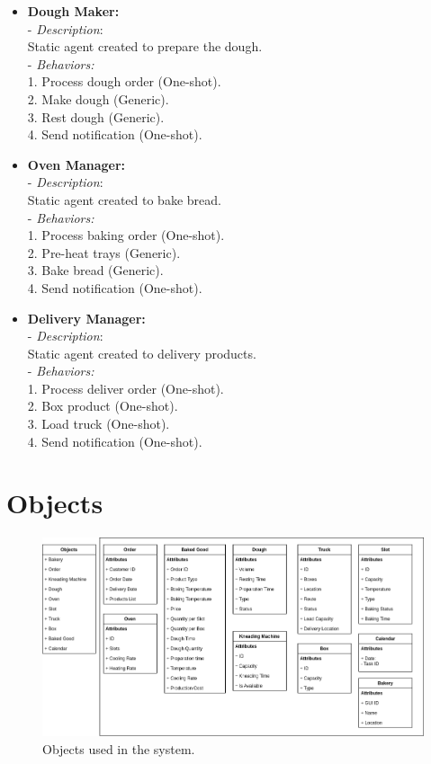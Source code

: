 \documentclass[a4paper]{article}
\begin{document}
\begin{itemize}
		 \item{\textbf{Dough Maker:} \\
		 	- \textit{Description}:\\
		 	Static agent created to prepare the dough. \\
		 	- \textit{Behaviors:} \\
		 	1. Process dough order (One-shot).\\
		 	2. Make dough (Generic).\\
		 	3. Rest dough (Generic).\\
		 	4. Send notification (One-shot).}
		 
		 \item{\textbf{Oven Manager:} \\
		 	- \textit{Description}:\\
		 	Static agent created to bake bread. \\
		 	- \textit{Behaviors:} \\
		 	1. Process baking order (One-shot).\\
		 	2. Pre-heat trays (Generic).\\
		 	3. Bake bread (Generic).\\
		 	4. Send notification (One-shot).}
		 
		 \item{\textbf{Delivery Manager:} \\
		 	- \textit{Description}:\\
		 	Static agent created to delivery products. \\
		 	- \textit{Behaviors:} \\
		 	1. Process deliver order (One-shot).\\
		 	2. Box product (One-shot).\\
		 	3. Load truck (One-shot).\\
		 	4. Send notification (One-shot).}
	 \end{itemize}
	 \newpage
	 \section{Objects}
	 
	 \begin{figure}[h!]
	 	\includegraphics[scale=0.4]{img/architecture-Objects.png}
	 	\caption{Objects used in the system.}
	 	\label{fig: ob}
	 \end{figure}
	
\end{document}
